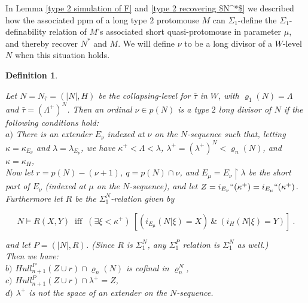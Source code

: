 \documentclass[12pt]{article}
\newtheorem{defn}[thm]{Definition}
\begin{document}
In Lemma \ref{type 2 simulation of F} and \ref{type 2 recovering $N^*$} we described how the associated ppm of a long type $2$ protomouse $M$ can $\Sigma_1$-define the $\Sigma_1$-definability relation of $M$'s associated short quasi-protomouse in parameter $\mu$, and thereby recover $N^*$ and $M$.  We will define $\nu$ to be a long divisor of a $W$-level $N$ when this situation holds.


\begin{defn} \label{type 2 long divisor}


Let $N = N_{\bar{\tau}} = (|N| , H )$ be the collapsing-level for $\bar{\tau}$ in $W$, with $\varrho_{1}(N) = \Lambda$ and $\bar{\tau} = (\Lambda^+ )^N$.  Then an ordinal $\nu \in p(N)$ is a type $2$ long divisor of $N$ if the following conditions hold:\\


\indent \indent $a)$ There is an extender $E_\nu$ indexed at $\nu$ on the $N$-sequence such that, letting $\kappa = \kappa_{E_\nu}$ and $\lambda = \lambda_{E_\nu}$, we have $\kappa^+ < \Lambda < \lambda$, $\lambda^+ = (\lambda^+)^N < \varrho_n (N)$, and $\kappa = \kappa_H$,\\

Now let $r = p (N) - (\nu + 1)$, $q = p (N) \cap \nu$, and $E_\mu = E_\nu \restriction \lambda$ be the short part of $E_\nu$ (indexed at $\mu$ on the $N$-sequence), and let $Z = i_{E_\nu}``(\kappa^+) =  i_{E_\mu}``(\kappa^+)$.  Furthermore let $R$ be the $\Sigma_1^N$-relation given by

\[
N \models R ( X , Y ) \ \text{ iff } \ ( \exists \xi < \kappa^+ ) \  [ ( i_{E_\mu} (N | \xi ) = X) \ \& \ ( i_H (N | \xi) = Y ) ] \ .
\]

and let $P = (|N|, R)$.  (Since $R$ is $\Sigma_1^N$, any $\Sigma_1^P$ relation is $\Sigma_1^N$ as well.)\\


Then we have:\\



\indent \indent $b)$ $Hull_{n+1}^P ( Z \cup r ) \cap \varrho_n (N)$ is cofinal in $\varrho_n^N$,\\

\indent \indent $c)$ $Hull_{n+1}^P ( Z \cup r ) \cap \lambda^+ = Z$,\\

\indent \indent $d)$ $\lambda^+$ is not the space of an extender on the $N$-sequence.\\


\end{defn}
\end{document}
